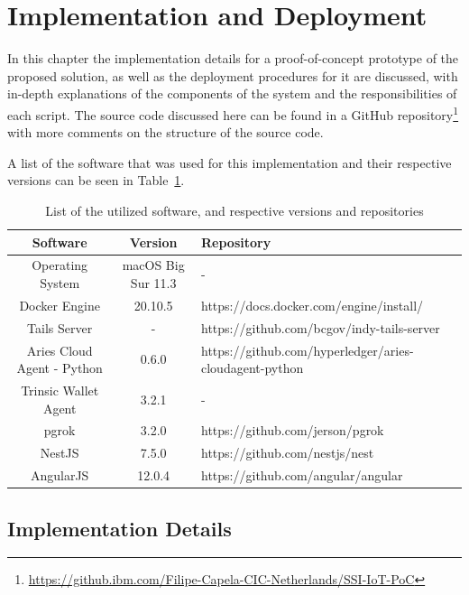 \section{Implementation and Deployment}
\label{sec:implementation_and_deployment_details}

In this chapter the implementation details for a proof-of-concept prototype of the proposed solution, as well as the deployment procedures for it are discussed, with in-depth explanations of the components of the system and the responsibilities of each script. The source code discussed here can be found in a GitHub repository\footnote{\url{https://github.ibm.com/Filipe-Capela-CIC-Netherlands/SSI-IoT-PoC}} with more comments on the structure of the source code.

A list of the software that was used for this implementation and their respective versions can be seen in Table~\ref{tab:list_of_software}.

\begin{table}[!htb]
    \centering
    \begin{tabularx}{\linewidth}{|c|c|X|}
    \hline
    \textbf{Software} & \textbf{Version} & \textbf{Repository} \\
    \hline
    Operating System & macOS Big Sur 11.3 & - \\
    Docker Engine & 20.10.5 & https://docs.docker.com/engine/install/ \\ 
    Tails Server & - & https://github.com/bcgov/indy-tails-server \\
    Aries Cloud Agent - Python  & 0.6.0 & https://github.com/hyperledger/aries-cloudagent-python \\ 
    Trinsic Wallet Agent & 3.2.1 & - \\
    pgrok & 3.2.0 & https://github.com/jerson/pgrok \\ 
    NestJS & 7.5.0 & https://github.com/nestjs/nest \\ 
    AngularJS & 12.0.4 & https://github.com/angular/angular \\ 
    \hline
    \end{tabularx}
    \caption{List of the utilized software, and respective versions and repositories}
    \label{tab:list_of_software}
\end{table}

\subsection{Implementation Details}
\label{subsec:implementation_details}

